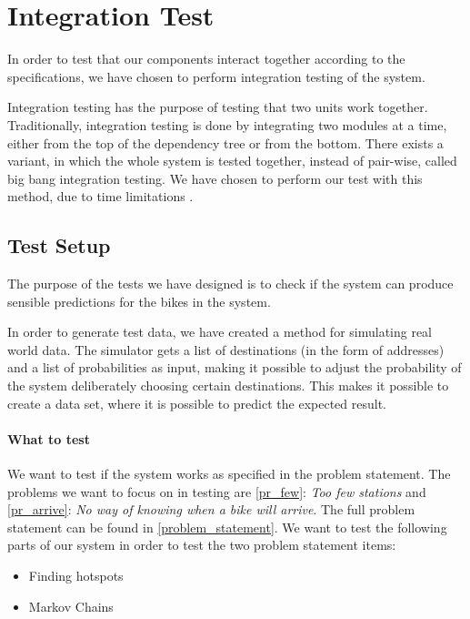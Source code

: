 \section{Integration Test}

In order to test that our components interact together according to the specifications, we have chosen to perform integration testing of the system.

Integration testing has the purpose of testing that two units work together. 
Traditionally, integration testing is done by integrating two modules at a time, either from the top of the dependency tree or from the bottom.
There exists a variant, in which the whole system is tested together, instead of pair-wise, called big bang integration testing.
We have chosen to perform our test with this method, due to time limitations \cite{inttest}.

\subsection{Test Setup}
The purpose of the tests we have designed is to check if the system can produce sensible predictions for the bikes in the system.

In order to generate test data, we have created a method for simulating real world data. 
The simulator gets a list of destinations (in the form of addresses) and a list of probabilities as input, making it possible to adjust the probability of the system deliberately choosing certain destinations.
This makes it possible to create a data set, where it is possible to predict the expected result.

\paragraph{What to test}
We want to test if the system works as specified in the problem statement.
The problems we want to focus on in testing are \ref{pr_few}: \textit{Too few stations} and \ref{pr_arrive}: \textit{No way of knowing when a bike will arrive}. 
The full problem statement can be found in \cref{problem_statement}.
We want to test the following parts of our system in order to test the two problem statement items:

\begin{itemize}
\item Finding hotspots 
\item Markov Chains
\end{itemize}

